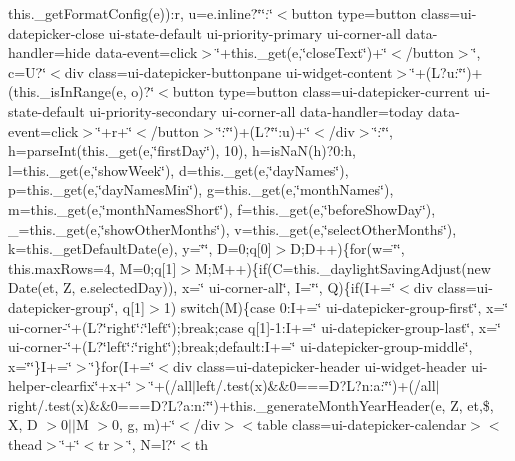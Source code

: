 {{\begin{DoxyParamCaption}
this.\+\_\+get\+Format\+Config(e))\+:r, u=e.\+inline?\char`\"{}\char`\"{}\+:\char`\"{}$<$button type=\textquotesingle{}button\textquotesingle{} class=\textquotesingle{}ui-\/datepicker-\/close ui-\/state-\/default ui-\/priority-\/primary ui-\/corner-\/all\textquotesingle{} data-\/handler=\textquotesingle{}hide\textquotesingle{} data-\/event=\textquotesingle{}click\textquotesingle{}$>$\char`\"{}+this.\+\_\+get(e,\char`\"{}close\+Text\char`\"{})+\char`\"{}$<$/button$>$\char`\"{}, c=\+U?\char`\"{}$<$div class=\textquotesingle{}ui-\/datepicker-\/buttonpane ui-\/widget-\/content\textquotesingle{}$>$\char`\"{}+(\+L?u\+:\char`\"{}\char`\"{})+(this.\+\_\+is\+In\+Range(e, o)?\char`\"{}$<$button type=\textquotesingle{}button\textquotesingle{} class=\textquotesingle{}ui-\/datepicker-\/current ui-\/state-\/default ui-\/priority-\/secondary ui-\/corner-\/all\textquotesingle{} data-\/handler=\textquotesingle{}today\textquotesingle{} data-\/event=\textquotesingle{}click\textquotesingle{}$>$\char`\"{}+r+\char`\"{}$<$/button$>$\char`\"{}\+:\char`\"{}\char`\"{})+(\+L?\char`\"{}\char`\"{}\+:u)+\char`\"{}$<$/div$>$\char`\"{}\+:\char`\"{}\char`\"{}, h=parse\+Int(this.\+\_\+get(e,\char`\"{}first\+Day\char`\"{}), 10), h=is\+Na\+N(h)?0\+:h, l=this.\+\_\+get(e,\char`\"{}show\+Week\char`\"{}), d=this.\+\_\+get(e,\char`\"{}day\+Names\char`\"{}), p=this.\+\_\+get(e,\char`\"{}day\+Names\+Min\char`\"{}), g=this.\+\_\+get(e,\char`\"{}month\+Names\char`\"{}), m=this.\+\_\+get(e,\char`\"{}month\+Names\+Short\char`\"{}), f=this.\+\_\+get(e,\char`\"{}before\+Show\+Day\char`\"{}), \+\_\+=this.\+\_\+get(e,\char`\"{}show\+Other\+Months\char`\"{}), v=this.\+\_\+get(e,\char`\"{}select\+Other\+Months\char`\"{}), k=this.\+\_\+get\+Default\+Date(e), y=\char`\"{}\char`\"{}, D=0;q\mbox{[}0\mbox{]}$>$\+D;\+D++)\{for(w=\char`\"{}\char`\"{}, this.\+max\+Rows=4, M=0;q\mbox{[}1\mbox{]}$>$\+M;\+M++)\{if(\+C=this.\+\_\+daylight\+Saving\+Adjust(new Date(et, Z, e.\+selected\+Day)), x=\char`\"{} ui-\/corner-\/all\char`\"{}, I=\char`\"{}\char`\"{}, Q)\{if(\+I+=\char`\"{}$<$div class=\textquotesingle{}ui-\/datepicker-\/group\char`\"{}, q\mbox{[}1\mbox{]}$>$1) switch(\+M)\{case 0\+:\+I+=\char`\"{} ui-\/datepicker-\/group-\/first\char`\"{}, x=\char`\"{} ui-\/corner-\/\char`\"{}+(\+L?\char`\"{}right\char`\"{}\+:\char`\"{}left\char`\"{});break;case q\mbox{[}1\mbox{]}-\/1\+:\+I+=\char`\"{} ui-\/datepicker-\/group-\/last\char`\"{}, x=\char`\"{} ui-\/corner-\/\char`\"{}+(\+L?\char`\"{}left\char`\"{}\+:\char`\"{}right\char`\"{});break;default\+:\+I+=\char`\"{} ui-\/datepicker-\/group-\/middle\char`\"{}, x=\char`\"{}\char`\"{}\}\+I+=\char`\"{}\textquotesingle{}$>$\char`\"{}\}for(\+I+=\char`\"{}$<$div class=\textquotesingle{}ui-\/datepicker-\/header ui-\/widget-\/header ui-\/helper-\/clearfix\char`\"{}+x+\char`\"{}\textquotesingle{}$>$\char`\"{}+(/all$\vert$left/.\+test(x)\&\&0===\+D?\+L?n\+:a\+:\char`\"{}\char`\"{})+(/all$\vert$right/.\+test(x)\&\&0===\+D?\+L?a\+:n\+:\char`\"{}\char`\"{})+this.\+\_\+generate\+Month\+Year\+Header(e, Z, et,\$, X, D $>$0$\vert$$\vert$\+M $>$0, g, m)+\char`\"{}$<$/div$>$$<$table class=\textquotesingle{}ui-\/datepicker-\/calendar\textquotesingle{}$>$$<$thead$>$\char`\"{}+\char`\"{}$<$tr$>$\char`\"{}, N=l?\char`\"{}$<$th 
\end{DoxyParamCaption}}}
